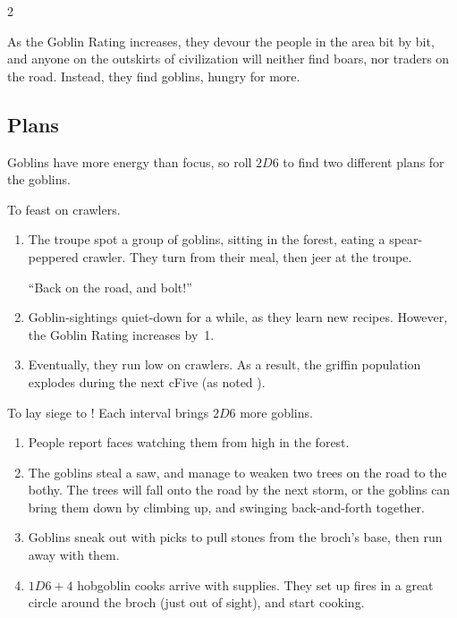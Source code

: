 \begin{multicols}{2}
\exampleGoblinEnc

As the Goblin Rating increases, they devour the people in the area bit by bit, and anyone on the outskirts of civilization will neither find boars, nor traders on the road.
Instead, they find goblins, hungry for more.

\subsection{Plans}

Goblins have more energy than focus, so roll $2D6$ to find two different plans for the goblins.

\bigbreak

\begin{dlist}
  \item
  To feast on crawlers.
  \begin{enumerate}
    \item
      The troupe spot a group of goblins, sitting in the forest, eating a spear-peppered \gls{crawler}.
    They turn from their meal, then jeer at the troupe.

    ``Back on the road, and bolt!''
    \item
    Goblin-sightings quiet-down for a while, as they learn new recipes.
    However, the Goblin Rating increases by~1.
    \item
    Eventually, they run low on \glspl{crawler}.
    As a result, the \gls{griffin} population explodes during the next \gls{cFive} (as noted ).
  \end{enumerate}
  \item
  To lay siege to !
  Each \gls{interval} brings $2D6$ more goblins.
  \begin{enumerate}
    \item
    People report faces watching them from high in the forest.
    \item
    The goblins steal a saw, and manage to weaken two trees on the road to the \gls{bothy}.
    The trees will fall onto the road by the next storm, or the goblins can bring them down by climbing up, and swinging back-and-forth together.
    \item
    Goblins sneak out with picks to pull stones from the \gls{broch}'s base, then run away with them.
    \item
    $1D6+4$ hobgoblin cooks arrive with supplies.
    They set up fires in a great circle around the \gls{broch} (just out of sight), and start cooking.


\end{enumerate}
\end{dlist}
\end{multicols}
